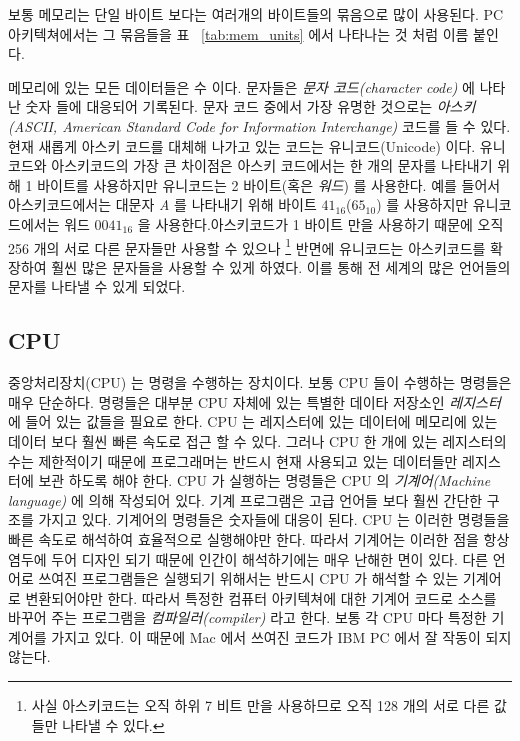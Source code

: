 보통 메모리는 단일 바이트 보다는 여러개의 바이트들의 묶음으로 많이 사용된다. PC 아키텍쳐에서는
그 묶음들을 표 ~\ref{tab:mem_units} 에서 나타나는 것 처럼 이름 붙인다. 

메모리에 있는 모든 데이터들은 수 이다. 문자들은 \emph{문자 코드(character code)} 에 나타난 숫자
들에 대응되어 기록된다. 문자 코드 중에서 가장 유명한 것으로는 \emph{아스키(ASCII, American
Standard Code for Information Interchange)} 코드를 들 수 있다. 현재 새롭게 아스키 코드를 대체해
나가고 있는 코드는 유니코드(Unicode) 이다. 유니코드와 아스키코드의 가장 큰 차이점은 아스키 코드에서는
한 개의 문자를 나타내기 위해 1 바이트를 사용하지만 유니코드는 2 바이트(혹은 \emph{워드}) 를 사용한다. 
예를 들어서 아스키코드에서는 대문자 \emph{A} 를 나타내기 위해 바이트 $41_{16}$($65_{10}$) 를 사용하지만
유니코드에서는 워드 $0041_{16}$ 을 사용한다.아스키코드가 1 바이트 만을 사용하기 때문에 오직 256 개의 서로
다른 문자들만 사용할 수 있으나 \footnote{사실 아스키코드는 오직 하위 7 비트 만을 사용하므로 오직 128 개의 
서로 다른 값들만 나타낼 수 있다.} 반면에 유니코드는 아스키코드를 확장하여 훨씬 많은 문자들을 사용할 수 있게
하였다. 이를 통해 전 세계의 많은 언어들의 문자를 나타낼 수 있게 되었다. 


\subsection{CPU}

중앙처리장치(CPU) 는 명령을 수행하는 장치이다. 보통 CPU 들이 수행하는 명령들은 매우 단순하다. 명령들은 대부분
CPU 자체에 있는 특별한 데이타 저장소인 \emph{레지스터} 에 들어 있는 값들을 필요로 한다. 
CPU 는 레지스터에 있는 데이터에 메모리에 있는 데이터 보다 훨씬 빠른 속도로 접근 할 수 있다. 그러나 CPU 한 개에
있는 레지스터의 수는 제한적이기 때문에 프로그래머는 반드시 현재 사용되고 있는 데이터들만 레지스터에 보관
하도록 해야 한다. 
CPU 가 실행하는 명령들은 CPU 의 \emph{기계어(Machine language)} 에 의해 작성되어 있다. 기계 프로그램은 
고급 언어들 보다 훨씬 간단한 구조를 가지고 있다. 기계어의 명령들은 숫자들에 대응이 된다. CPU 는 이러한 명령들을 
 빠른 속도로 해석하여 효율적으로 실행해야만 한다. 따라서 기계어는 이러한 점을 항상 
염두에 두어 디자인 되기 때문에 인간이 해석하기에는 매우 난해한 면이 있다. 다른 언어로 쓰여진 프로그램들은
실행되기 위해서는 반드시 CPU 가 해석할 수 있는 기계어로 변환되어야만 한다. 따라서 특정한 컴퓨터 아키텍쳐에 대한 기계어 코드로 
소스를 바꾸어 주는 프로그램을 \emph{컴파일러(compiler)}  라고 한다. 보통 각 CPU 마다 특정한
기계어를 가지고 있다. 이 때문에  Mac 에서 쓰여진 코드가 IBM PC 에서 잘 작동이 되지 않는다. 

